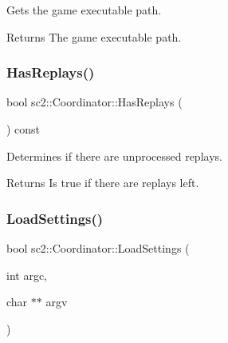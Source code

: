 Gets the game executable path. \begin{DoxyReturn}{Returns}
The game executable path. 
\end{DoxyReturn}
\mbox{\label{classsc2_1_1_coordinator_a451a422eb904f69b55b273ddfe3f0e58}} 
\subsubsection{\texorpdfstring{Has\+Replays()}{HasReplays()}}
{\footnotesize\ttfamily bool sc2\+::\+Coordinator\+::\+Has\+Replays (\begin{DoxyParamCaption}{ }\end{DoxyParamCaption}) const}

Determines if there are unprocessed replays. \begin{DoxyReturn}{Returns}
Is true if there are replays left. 
\end{DoxyReturn}
\mbox{\label{classsc2_1_1_coordinator_ada059b9a60d901be047ef33ce612c5d2}} 
\subsubsection{\texorpdfstring{Load\+Settings()}{LoadSettings()}}
{\footnotesize\ttfamily bool sc2\+::\+Coordinator\+::\+Load\+Settings (\begin{DoxyParamCaption}\item[{int}]{argc,  }\item[{char $\ast$$\ast$}]{argv }\end{DoxyParamCaption})}

